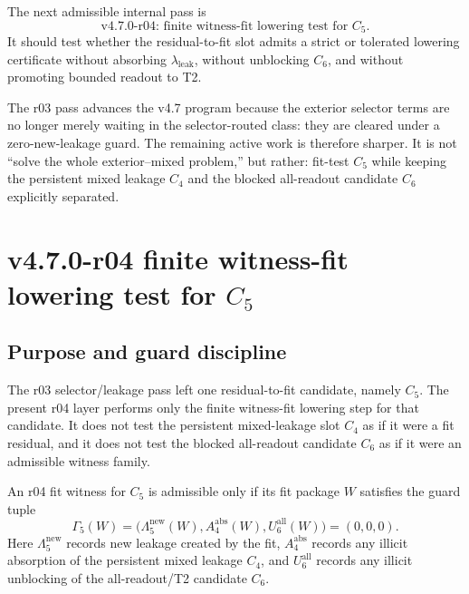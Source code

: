 \begin{corollary}
\label{cor:v470-r03-permitted-r04-direction}
The next admissible internal pass is
\[
\text{v4.7.0-r04: finite witness-fit lowering test for }C_5.
\]
It should test whether the residual-to-fit slot admits a strict or tolerated
lowering certificate without absorbing \(\lambda_{\mathrm{leak}}\), without
unblocking \(C_6\), and without promoting bounded readout to T2.
\end{corollary}

\begin{remark}[r03 summary]
The r03 pass advances the v4.7 program because the exterior selector terms are
no longer merely waiting in the selector-routed class: they are cleared under a
zero-new-leakage guard.  The remaining active work is therefore sharper.  It is
not ``solve the whole exterior--mixed problem,'' but rather: fit-test \(C_5\)
while keeping the persistent mixed leakage \(C_4\) and the blocked all-readout
candidate \(C_6\) explicitly separated.
\end{remark}


\clearpage
\section{v4.7.0-r04 finite witness-fit lowering test for \texorpdfstring{$C_5$}{C5}}
\label{sec:v470-r04-finite-witness-fit-lowering-test}

\subsection{Purpose and guard discipline}
\label{subsec:v470-r04-purpose-guards}

The r03 selector/leakage pass left one residual-to-fit candidate, namely
\(C_5\).  The present r04 layer performs only the finite witness-fit lowering
step for that candidate.  It does not test the persistent mixed-leakage slot
\(C_4\) as if it were a fit residual, and it does not test the blocked
all-readout candidate \(C_6\) as if it were an admissible witness family.

\begin{definition}
\label{def:v470-r04-admissible-c5-fit-witness}
An r04 fit witness for \(C_5\) is admissible only if its fit package \(W\)
satisfies the guard tuple
\[
\Gamma_5(W)=
\bigl(
\Lambda_5^{\mathrm{new}}(W),
A_4^{\mathrm{abs}}(W),
U_6^{\mathrm{all}}(W)
\bigr)=(0,0,0).
\]
Here \(\Lambda_5^{\mathrm{new}}\) records new leakage created by the fit,
\(A_4^{\mathrm{abs}}\) records any illicit absorption of the persistent mixed
leakage \(C_4\), and \(U_6^{\mathrm{all}}\) records any illicit unblocking of
the all-readout/T2 candidate \(C_6\).
\end{definition}

